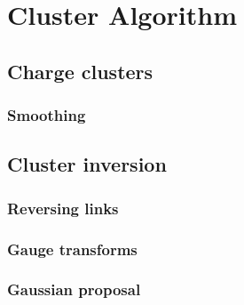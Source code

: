 \chapter{Cluster Algorithm}\label{ch:cluster}

\section{Charge clusters}

\subsection{Smoothing}

\section{Cluster inversion}

\subsection{Reversing links}

\subsection{Gauge transforms}

\subsection{Gaussian proposal}



